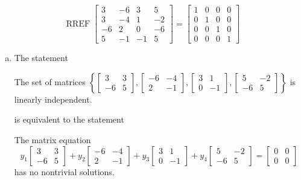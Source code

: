 \begin{exerciseAnswer} 


\[\operatorname{RREF} \left[\begin{array}{cccc}
3 & -6 & 3 & 5 \\
3 & -4 & 1 & -2 \\
-6 & 2 & 0 & -6 \\
5 & -1 & -1 & 5
\end{array}\right] = \left[\begin{array}{cccc}
1 & 0 & 0 & 0 \\
0 & 1 & 0 & 0 \\
0 & 0 & 1 & 0 \\
0 & 0 & 0 & 1
\end{array}\right] \]


\begin{enumerate}[(a)]
\item The statement 
\begin{center}\begin{minipage}{0.8\textwidth}
 The set of matrices \( \left\{ \left[\begin{array}{cc}
3 & 3 \\
-6 & 5
\end{array}\right] , \left[\begin{array}{cc}
-6 & -4 \\
2 & -1
\end{array}\right] , \left[\begin{array}{cc}
3 & 1 \\
0 & -1
\end{array}\right] , \left[\begin{array}{cc}
5 & -2 \\
-6 & 5
\end{array}\right] \right\} \) is linearly independent.
\end{minipage}\end{center}
     is equivalent to the statement 
\begin{center}\begin{minipage}{0.8\textwidth}
 The matrix equation \[ y_{1} \left[\begin{array}{cc}
3 & 3 \\
-6 & 5
\end{array}\right] + y_{2} \left[\begin{array}{cc}
-6 & -4 \\
2 & -1
\end{array}\right] + y_{3} \left[\begin{array}{cc}
3 & 1 \\
0 & -1
\end{array}\right] + y_{4} \left[\begin{array}{cc}
5 & -2 \\
-6 & 5
\end{array}\right] = \left[\begin{array}{cc}
0 & 0 \\
0 & 0
\end{array}\right] \] has no nontrivial solutions. 
\end{minipage}\end{center}
    

\end{enumerate}
\end{exerciseAnswer}
